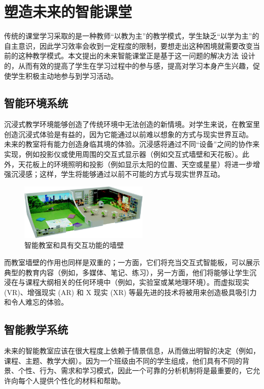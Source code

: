 \documentclass[UTF8]{ctexart}
\begin{document}
	\section{塑造未来的智能课堂}
		传统的课堂学习采取的是一种教师“以教为主”的教学模式，学生缺乏“以学为主”的自主意识，因此学习效率会收到一定程度的限制，要想走出这种困境就需要改变当前的这种教学模式。本文提出的未来智能课堂正是基于这一问题的解决方法
		设计的，从而有效的提高了学生在学习过程中的参与感，提高对学习本身产生兴趣，促使学生积极主动地参与到学习活动。
		
		\subsection{智能环境系统}
		沉浸式教学环境能够创造了传统环境中无法创造的新情境。对学生来说，在教室里创造沉浸式体验是有益的，因为它能通过以前难以想象的方式与现实世界互动。
		未来的教室将有能力创造身临其境的体验。沉浸感将通过不同“设备”之间的协作来实现，例如投影仪或使用周围的交互式显示器（例如交互式墙壁和天花板）。此外，天花板上的环境照明和投影（例如显示太阳的位置、天空或星星）将进一步增强沉浸感；这样，学生将能够通过以前不可能的方式与现实世界互动。
		
		\begin{figure}[H]
		\centering
		\includegraphics[width=0.55\textwidth]{smart classroom}			
		\caption{智能教室和具有交互功能的墙壁}
		\end{figure}

		而教室墙壁的作用也同样是双重的；一方面，它们将充当交互式智能板，可以展示典型的教育内容（例如，多媒体、笔记、练习），另一方面，他们将能够让学生沉浸在与课程大纲相关的任何环境中（例如，实验室或某地理环境）。而虚拟现实 (VR)、增强现实 (AR) 和 X 现实 (XR) 等最先进的技术将被用来创造极具吸引力和令人难忘的体验。
		
		\subsection{智能教学系统}
		未来的智能教室应该在很大程度上依赖于情景信息，从而做出明智的决定（例如，课程、主题、教学大纲）。因为一个班级由不同的学生组成，他们具有不同的背景、个性、行为、需求和学习模式，因此一个可靠的分析机制将是最重要的，它允许向每个人提供个性化的材料和帮助。
		
\end{document}
